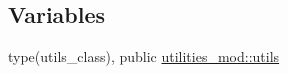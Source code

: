 \subsection*{Variables}
\begin{DoxyCompactItemize}
\item 
type(utils\+\_\+class), public \mbox{\hyperlink{namespaceutilities__mod_aa12c2506b3107528a2511d059186f12d}{utilities\+\_\+mod\+::utils}}
\end{DoxyCompactItemize}

